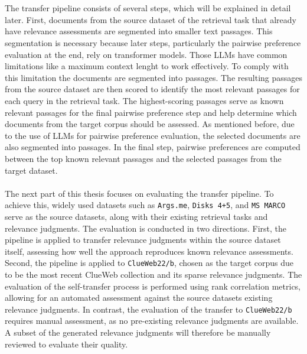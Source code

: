 \\\\
The transfer pipeline consists of several steps, which will be explained in detail later. First, documents from the source dataset of the retrieval task that already have relevance assessments are segmented into smaller text passages. This segmentation is necessary because later steps, particularly the pairwise preference evaluation at the end, rely on transformer models. Those LLMs have common limitations like a maximum context lenght to work effectively. To comply with this limitation the documents are segmented into passages. The resulting passages from the source dataset are then scored to identify the most relevant passages for each query in the retrieval task. The highest-scoring passages serve as known relevant passages for the final pairwise preference step and help determine which documents from the target corpus should be assessed. As mentioned before, due to the use of LLMs for pairwise preference evaluation, the selected documents are also segmented into passages. In the final step, pairwise preferences are computed between the top known relevant passages and the selected passages from the target dataset.
\\\\
The next part of this thesis focuses on evaluating the transfer pipeline. To achieve this, widely used datasets such as \texttt{Args.me}, \texttt{Disks 4+5}, and \texttt{MS MARCO} serve as the source datasets, along with their existing retrieval tasks and relevance judgments. The evaluation is conducted in two directions. First, the pipeline is applied to transfer relevance judgments within the source dataset itself, assessing how well the approach reproduces known relevance assessments. Second, the pipeline is applied to \texttt{ClueWeb22/b}, chosen as the target corpus due to be the most recent ClueWeb collection and its sparse relevance judgments. The evaluation of the self-transfer process is performed using rank correlation metrics, allowing for an automated assessment against the source datasets existing relevance judgments. In contrast, the evaluation of the transfer to \texttt{ClueWeb22/b} requires manual assessment, as no pre-existing relevance judgments are available. A subset of the generated relevance judgments will therefore be manually reviewed to evaluate their quality.